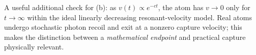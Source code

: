 A useful additional check for (b): as
\(v(t)\propto e^{-ct}\), the atom has
\(v\to0\) only for \(t\to\infty\) within the
ideal linearly decreasing resonant-velocity
model. Real atoms undergo stochastic photon
recoil and exit at a nonzero capture velocity;
this makes the distinction between a
\emph{mathematical endpoint} and practical
capture physically relevant.

